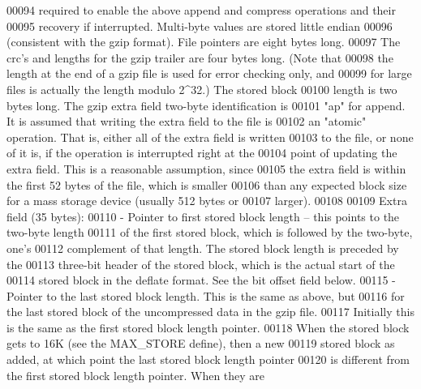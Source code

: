 \begin{DoxyCode}
00094 \textcolor{comment}{   required to enable the above append and compress operations and their}
00095 \textcolor{comment}{   recovery if interrupted.  Multi-byte values are stored little endian}
00096 \textcolor{comment}{   (consistent with the gzip format).  File pointers are eight bytes long.}
00097 \textcolor{comment}{   The crc's and lengths for the gzip trailer are four bytes long.  (Note that}
00098 \textcolor{comment}{   the length at the end of a gzip file is used for error checking only, and}
00099 \textcolor{comment}{   for large files is actually the length modulo 2^32.)  The stored block}
00100 \textcolor{comment}{   length is two bytes long.  The gzip extra field two-byte identification is}
00101 \textcolor{comment}{   "ap" for append.  It is assumed that writing the extra field to the file is}
00102 \textcolor{comment}{   an "atomic" operation.  That is, either all of the extra field is written}
00103 \textcolor{comment}{   to the file, or none of it is, if the operation is interrupted right at the}
00104 \textcolor{comment}{   point of updating the extra field.  This is a reasonable assumption, since}
00105 \textcolor{comment}{   the extra field is within the first 52 bytes of the file, which is smaller}
00106 \textcolor{comment}{   than any expected block size for a mass storage device (usually 512 bytes or}
00107 \textcolor{comment}{   larger).}
00108 \textcolor{comment}{}
00109 \textcolor{comment}{   Extra field (35 bytes):}
00110 \textcolor{comment}{   - Pointer to first stored block length -- this points to the two-byte length}
00111 \textcolor{comment}{     of the first stored block, which is followed by the two-byte, one's}
00112 \textcolor{comment}{     complement of that length.  The stored block length is preceded by the}
00113 \textcolor{comment}{     three-bit header of the stored block, which is the actual start of the}
00114 \textcolor{comment}{     stored block in the deflate format.  See the bit offset field below.}
00115 \textcolor{comment}{   - Pointer to the last stored block length.  This is the same as above, but}
00116 \textcolor{comment}{     for the last stored block of the uncompressed data in the gzip file.}
00117 \textcolor{comment}{     Initially this is the same as the first stored block length pointer.}
00118 \textcolor{comment}{     When the stored block gets to 16K (see the MAX\_STORE define), then a new}
00119 \textcolor{comment}{     stored block as added, at which point the last stored block length pointer}
00120 \textcolor{comment}{     is different from the first stored block length pointer.  When they are}

\end{DoxyCode}
